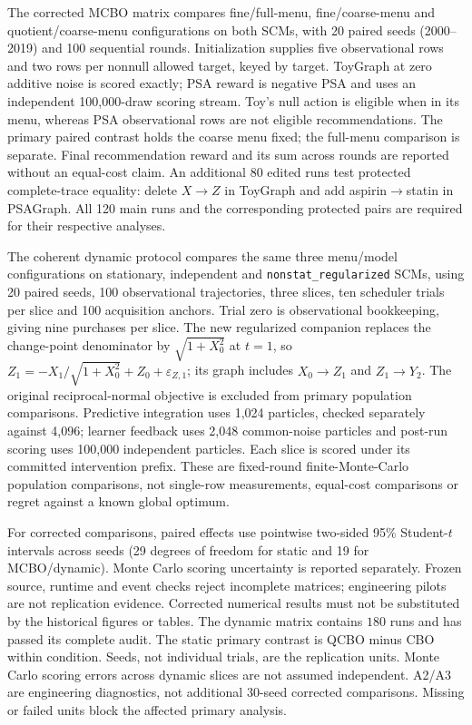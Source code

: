 \documentclass[twoside]{article}
\begin{document}
The corrected MCBO matrix compares fine/full-menu, fine/coarse-menu and quotient/coarse-menu configurations on both SCMs, with 20 paired seeds (2000--2019) and 100 sequential rounds. Initialization supplies five observational rows and two rows per nonnull allowed target, keyed by target. ToyGraph at zero additive noise is scored exactly; PSA reward is negative PSA and uses an independent 100,000-draw scoring stream. Toy's null action is eligible when in its menu, whereas PSA observational rows are not eligible recommendations. The primary paired contrast holds the coarse menu fixed; the full-menu comparison is separate. Final recommendation reward and its sum across rounds are reported without an equal-cost claim. An additional 80 edited runs test protected complete-trace equality: delete $X\to Z$ in ToyGraph and add aspirin$\to$statin in PSAGraph. All 120 main runs and the corresponding protected pairs are required for their respective analyses.

The coherent dynamic protocol compares the same three menu/model configurations on stationary, independent and \texttt{nonstat\_regularized} SCMs, using 20 paired seeds, 100 observational trajectories, three slices, ten scheduler trials per slice and 100 acquisition anchors. Trial zero is observational bookkeeping, giving nine purchases per slice. The new regularized companion replaces the change-point denominator by $\sqrt{1+X_0^2}$ at $t=1$, so $Z_1=-X_1/\sqrt{1+X_0^2}+Z_0+\varepsilon_{Z,1}$; its graph includes $X_0\to Z_1$ and $Z_1\to Y_2$. The original reciprocal-normal objective is excluded from primary population comparisons. Predictive integration uses 1,024 particles, checked separately against 4,096; learner feedback uses 2,048 common-noise particles and post-run scoring uses 100,000 independent particles. Each slice is scored under its committed intervention prefix. These are fixed-round finite-Monte-Carlo population comparisons, not single-row measurements, equal-cost comparisons or regret against a known global optimum.

For corrected comparisons, paired effects use pointwise two-sided 95\% Student-$t$ intervals across seeds (29 degrees of freedom for static and 19 for MCBO/dynamic). Monte Carlo scoring uncertainty is reported separately. Frozen source, runtime and event checks reject incomplete matrices; engineering pilots are not replication evidence. Corrected numerical results must not be substituted by the historical figures or tables.
The dynamic matrix contains $180$ runs and has passed its complete audit.
The static primary contrast is QCBO minus CBO within condition. Seeds,
not individual trials, are the replication units. Monte Carlo scoring
errors across dynamic slices are not assumed independent. A2/A3 are engineering diagnostics,
not additional 30-seed corrected comparisons. Missing or failed units
block the affected primary analysis.
\end{document}
